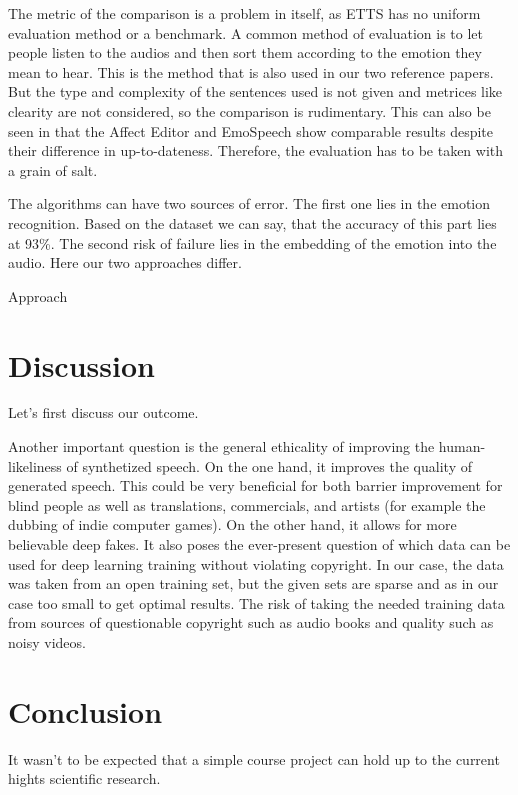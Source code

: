 \documentclass[11pt]{article}
\begin{document}
The metric of the comparison is a problem in itself, as ETTS has no uniform evaluation method or a benchmark. A common method of evaluation is to let people listen to the audios and then sort them according to the emotion they mean to hear. This is the method that is also used in our two reference papers. But the type and complexity of the sentences used is not given and metrices like clearity are not considered, so the comparison is rudimentary. This can also be seen in that the Affect Editor and EmoSpeech show comparable results despite their difference in up-to-dateness. Therefore, the evaluation has to be taken with a grain of salt.

The algorithms can have two sources of error. The first one lies in the emotion recognition. Based on the \cite{saravia-etal-2018-carer} dataset we can say, that the accuracy of this part lies at 93\%. The second risk of failure lies in the embedding of the emotion into the audio. Here our two approaches differ.


Approach

\section{Discussion}
\label{discussion}
Let's first discuss our outcome.

Another important question is the general ethicality of improving the human-likeliness of synthetized speech. On the one hand, it improves the quality of generated speech. This could be very beneficial for both barrier improvement for blind people as well as translations, commercials, and artists (for example the dubbing of indie computer games). On the other hand, it allows for more believable deep fakes. It also poses the ever-present question of which data can be used for deep learning training without violating copyright. In our case, the data was taken from an open training set, but the given sets are sparse and as in our case too small to get optimal results\cite{he_improve_2022}. The risk of taking the needed training data from sources of questionable copyright such as audio books and quality such as noisy videos.

\section{Conclusion}
\label{conclusion}
It wasn't to be expected that a simple course project can hold up to the current hights scientific research.
\end{document}
